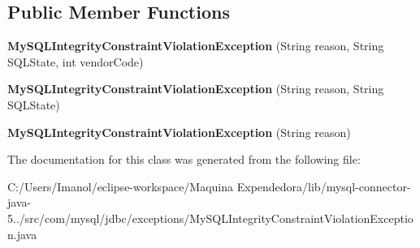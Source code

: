 \subsection*{Public Member Functions}
\begin{DoxyCompactItemize}
\item 
\mbox{\label{classcom_1_1mysql_1_1jdbc_1_1exceptions_1_1_my_s_q_l_integrity_constraint_violation_exception_a09fcbb8305e3e6b623ada04a89b4f191}} 
{\bfseries My\+S\+Q\+L\+Integrity\+Constraint\+Violation\+Exception} (String reason, String S\+Q\+L\+State, int vendor\+Code)
\item 
\mbox{\label{classcom_1_1mysql_1_1jdbc_1_1exceptions_1_1_my_s_q_l_integrity_constraint_violation_exception_adb646dcb5ca0b570c90a28ec7774cf36}} 
{\bfseries My\+S\+Q\+L\+Integrity\+Constraint\+Violation\+Exception} (String reason, String S\+Q\+L\+State)
\item 
\mbox{\label{classcom_1_1mysql_1_1jdbc_1_1exceptions_1_1_my_s_q_l_integrity_constraint_violation_exception_afab1c5aa360c8d987536e9221c9b85e1}} 
{\bfseries My\+S\+Q\+L\+Integrity\+Constraint\+Violation\+Exception} (String reason)
\end{DoxyCompactItemize}


The documentation for this class was generated from the following file\+:\begin{DoxyCompactItemize}
\item 
C\+:/\+Users/\+Imanol/eclipse-\/workspace/\+Maquina Expendedora/lib/mysql-\/connector-\/java-\/5../src/com/mysql/jdbc/exceptions/My\+S\+Q\+L\+Integrity\+Constraint\+Violation\+Exception.\+java\end{DoxyCompactItemize}
